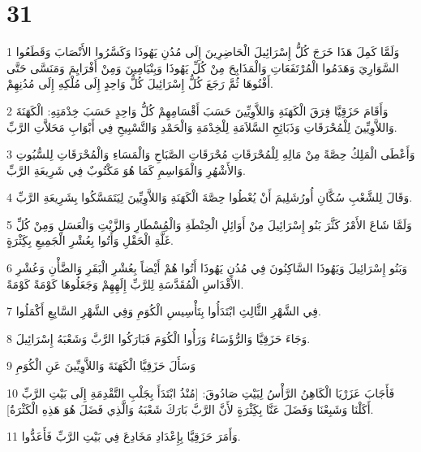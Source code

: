 \chapter{31}

\par 1 وَلَمَّا كَمِلَ هَذَا خَرَجَ كُلُّ إِسْرَائِيلَ الْحَاضِرِينَ إِلَى مُدُنِ يَهُوذَا وَكَسَّرُوا الأَنْصَابَ وَقَطَعُوا السَّوَارِيَ وَهَدَمُوا الْمُرْتَفَعَاتِ وَالْمَذَابِحَ مِنْ كُلِّ يَهُوذَا وَبِنْيَامِينَ وَمِنْ أَفْرَايِمَ وَمَنَسَّى حَتَّى أَفْنُوهَا ثُمَّ رَجَعَ كُلُّ إِسْرَائِيلَ كُلُّ وَاحِدٍ إِلَى مُلْكِهِ إِلَى مُدُنِهِمْ.
\par 2 وَأَقَامَ حَزَقِيَّا فِرَقَ الْكَهَنَةِ وَاللاَّوِيِّينَ حَسَبَ أَقْسَامِهِمْ كُلُّ وَاحِدٍ حَسَبَ خِدْمَتِهِ: الْكَهَنَةَ وَاللاَّوِيِّينَ لِلْمُحْرَقَاتِ وَذَبَائِحِ السَّلاَمَةِ لِلْخِدْمَةِ وَالْحَمْدِ وَالتَّسْبِيحِ فِي أَبْوَابِ مَحَلاَّتِ الرَّبِّ.
\par 3 وَأَعْطَى الْمَلِكُ حِصَّةً مِنْ مَالِهِ لِلْمُحْرَقَاتِ مُحْرَقَاتِ الصَّبَاحِ وَالْمَسَاءِ وَالْمُحْرَقَاتِ لِلسُّبُوتِ وَالأَشْهُرِ وَالْمَوَاسِمِ كَمَا هُوَ مَكْتُوبٌ فِي شَرِيعَةِ الرَّبِّ.
\par 4 وَقَالَ لِلشَّعْبِ سُكَّانِ أُورُشَلِيمَ أَنْ يُعْطُوا حِصَّةَ الْكَهَنَةِ وَاللاَّوِيِّينَ لِيَتَمَسَّكُوا بِشَرِيعَةِ الرَّبِّ.
\par 5 وَلَمَّا شَاعَ الأَمْرُ كَثَّرَ بَنُو إِسْرَائِيلَ مِنْ أَوَائِلِ الْحِنْطَةِ وَالْمُِسْطَارِ وَالزَّيْتِ وَالْعَسَلِ وَمِنْ كُلِّ غَلَّةِ الْحَقْلِ وَأَتُوا بِعُشْرِ الْجَمِيعِ بِكَِثْرَةٍ.
\par 6 وَبَنُو إِسْرَائِيلَ وَيَهُوذَا السَّاكِنُونَ فِي مُدُنِ يَهُوذَا أَتُوا هُمْ أَيْضاً بِعُشْرِ الْبَقَرِ وَالضَّأْنِ وَعُشْرِ الأَقْدَاسِ الْمُقَدَّسَةِ لِلرَّبِّ إِلَهِهِمْ وَجَعَلُوهَا كَوْمَةً كَوْمَةً.
\par 7 فِي الشَّهْرِ الثَّالِثِ ابْتَدَأُوا بِتَأْسِيسِ الْكُوَمِ وَفِي الشَّهْرِ السَّابِعِ أَكْمَلُوا.
\par 8 وَجَاءَ حَزَقِيَّا وَالرُّؤَسَاءُ وَرَأُوا الْكُوَمَ فَبَارَكُوا الرَّبَّ وَشَعْبَهُ إِسْرَائِيلَ.
\par 9 وَسَأَلَ حَزَقِيَّا الْكَهَنَةَ وَاللاَّوِيِّينَ عَنِ الْكُوَمِ
\par 10 فَأَجَابَ عَزَرْيَا الْكَاهِنُ الرَّأْسُ لِبَيْتِ صَادُوقَ: [مُنْذُ ابْتَدَأَ بِجَلْبِ التَّقْدِمَةِ إِلَى بَيْتِ الرَّبِّ أَكَلْنَا وَشَبِعْنَا وَفَضَلَ عَنَّا بِكَِثْرَةٍ لأَنَّ الرَّبَّ بَارَكَ شَعْبَهُ وَالَّذِي فَضَلَ هُوَ هَذِهِ الْكَثْرَةُ].
\par 11 وَأَمَرَ حَزَقِيَّا بِإِعْدَادِ مَخَادِعَ فِي بَيْتِ الرَّبِّ فَأَعَدُّوا.
